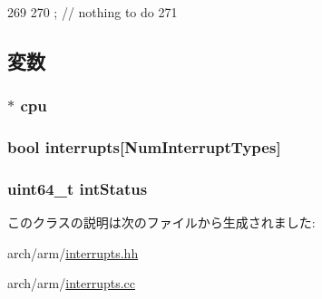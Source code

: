 \begin{DoxyCode}
269     {
270         ; // nothing to do
271     }
\end{DoxyCode}


\subsection{変数}
\hypertarget{classArmISA_1_1Interrupts_a7a31ca9fefb2fe821f29a270678912db}{
\subsubsection[{cpu}]{$\ast$ {\bf cpu}}}
\label{classArmISA_1_1Interrupts_a7a31ca9fefb2fe821f29a270678912db}
\hypertarget{classArmISA_1_1Interrupts_a1a97fbd95b3d09130494277ce6dcca67}{
\subsubsection[{interrupts}]{\setlength{\rightskip}{0pt plus 5cm}bool {\bf interrupts}\mbox{[}NumInterruptTypes\mbox{]}}}
\label{classArmISA_1_1Interrupts_a1a97fbd95b3d09130494277ce6dcca67}
\hypertarget{classArmISA_1_1Interrupts_a7bd80958fef7b80f720d1e764c63adb4}{
\subsubsection[{intStatus}]{\setlength{\rightskip}{0pt plus 5cm}uint64\_\-t {\bf intStatus}}}
\label{classArmISA_1_1Interrupts_a7bd80958fef7b80f720d1e764c63adb4}


このクラスの説明は次のファイルから生成されました:\begin{DoxyCompactItemize}
\item 
arch/arm/\hyperlink{arm_2interrupts_8hh}{interrupts.hh}\item 
arch/arm/\hyperlink{arm_2interrupts_8cc}{interrupts.cc}\end{DoxyCompactItemize}
